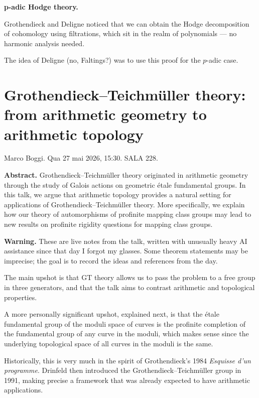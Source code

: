 \medskip\noindent
{\bf p-adic Hodge theory.}

Grothendieck and Deligne
noticed that we can obtain
the Hodge decomposition of cohomology
using filtrations, which sit
in the realm of polynomials ---
no harmonic analysis needed.

The idea of Deligne (no, Faltings?) 
was to use
this proof for the $p$-adic case.

\section{Grothendieck--Teichm\"uller theory: from arithmetic geometry to arithmetic topology}
\label{section-grothendieck-teichmuller-arithmetic-topology}

\noindent
Marco Boggi.
Qua 27 mai 2026, 15:30.
SALA 228.

\medskip\noindent
{\bf Abstract.}
Grothendieck--Teichm\"uller theory originated
in arithmetic geometry through the study of
Galois actions on geometric \'etale
fundamental groups. In this talk, we argue
that arithmetic topology provides a natural
setting for applications of
Grothendieck--Teichm\"uller theory. More
specifically, we explain how our theory of
automorphisms of profinite mapping class
groups may lead to new results on profinite
rigidity questions for mapping class groups.

\medskip\noindent
{\bf Warning.}
These are live notes from the talk,
written with unusually heavy AI assistance
since that day I forgot my glasses.
Some theorem
statements may be imprecise; the goal is to
record the ideas and references from the day.\medskip\noindent

\medskip\noindent
The main upshot is that GT theory allows us
to pass the problem to a free group in three
generators, and that the talk aims to
contrast arithmetic and topological
properties.

A more personally significant 
upshot, explained next,
is that the étale fundamental
group of the moduli space of curves
is the profinite completion of
the fundamental group of any curve in 
the moduli, which makes sense since the
underlying topological space of all curves
in the moduli is the same.

\medskip\noindent
Historically, this is very much in the spirit
of Grothendieck's 1984 \emph{Esquisse d'un
programme}. Drinfeld then introduced the
Grothendieck--Teichm\"uller group in 1991,
making precise a framework that was already
expected to have arithmetic applications.

